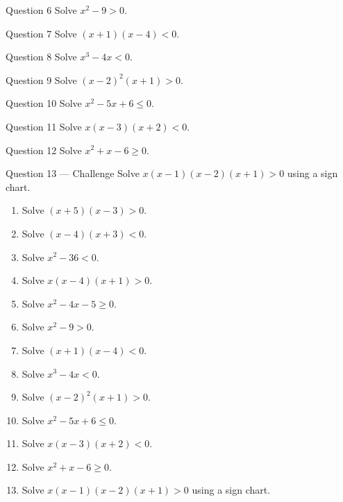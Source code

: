 \documentclass[11pt]{article}
\begin{document}
\begin{qbox}{Question 6}
Solve $x^2-9>0$.\workspace{2.4cm}
\end{qbox}

\begin{qbox}{Question 7}
Solve $(x+1)(x-4)<0$.\workspace{2.4cm}
\end{qbox}

\begin{qbox}{Question 8}
Solve $x^3-4x<0$.\workspace{2.4cm}
\end{qbox}

\begin{qbox}{Question 9}
Solve $(x-2)^2(x+1)>0$.\workspace{2.4cm}
\end{qbox}

\begin{qbox}{Question 10}
Solve $x^2-5x+6\le0$.\workspace{2.4cm}
\end{qbox}

\begin{qbox}{Question 11}
Solve $x(x-3)(x+2)<0$.\workspace{2.4cm}
\end{qbox}

\begin{qbox}{Question 12}
Solve $x^2+x-6\ge0$.\workspace{2.4cm}
\end{qbox}

\begin{qbox}{Question 13 --- Challenge}
Solve $x(x-1)(x-2)(x+1)>0$ using a sign chart.\workspace{3.5cm}
\end{qbox}

\clearpage
{}

\begin{recapbox}
\begin{multicols}{2}
\small
\begin{enumerate}[leftmargin=*,itemsep=3pt]
  \item Solve $(x+5)(x-3)>0$.
  \item Solve $(x-4)(x+3)<0$.
  \item Solve $x^2-36<0$.
  \item Solve $x(x-4)(x+1)>0$.
  \item Solve $x^2-4x-5\ge0$.
  \item Solve $x^2-9>0$.
  \item Solve $(x+1)(x-4)<0$.
  \item Solve $x^3-4x<0$.
  \item Solve $(x-2)^2(x+1)>0$.
  \item Solve $x^2-5x+6\le0$.
  \item Solve $x(x-3)(x+2)<0$.
  \item Solve $x^2+x-6\ge0$.
  \item Solve $x(x-1)(x-2)(x+1)>0$ using a sign chart.
\end{enumerate}
\end{multicols}
\end{recapbox}
\end{document}
